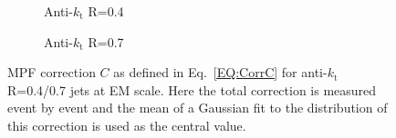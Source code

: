 \begin{figure}[!ht]
  \centering
  \begin{subfigure}{.5\textwidth}
    \centering
    \caption{Anti-$k_\mathrm{t}$ R=0.4}
  \end{subfigure}%
  \begin{subfigure}{.5\textwidth}  \centering
    \caption{Anti-$k_\mathrm{t}$ R=0.7}
  \end{subfigure}
  \caption[MPF Correction $C$ for anti-$k_\mathrm{t}$ R=0.4/0.7 jets]
  {\small MPF correction $C$ as defined in Eq.~\ref{EQ:CorrC} for anti-$k_\mathrm{t}$ R=0.4/0.7 jets at EM scale.  Here the total correction is measured event by event and the mean of a Gaussian fit to the distribution of this correction is used as the central value.  }
  \label{Fig:TopoCorrSingle_4-7}
\end{figure}





